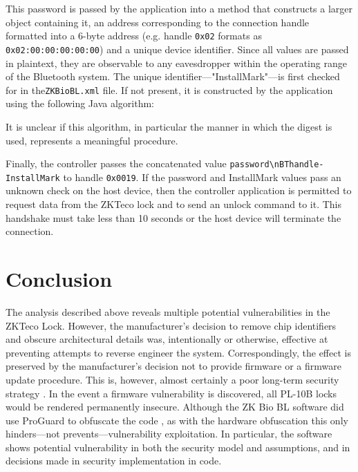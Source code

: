 \documentclass[conference]{IEEEtran}
\begin{document}
\bigskip

This password is passed by the application into a method that constructs a larger object containing it, an address corresponding to the connection handle formatted into a 6-byte address (e.g. handle \verb|0x02| formats as \verb|0x02:00:00:00:00:00|) and a unique device identifier.  Since all values are passed in plaintext, they are observable to any eavesdropper within the operating range of the Bluetooth system.  The unique identifier---"InstallMark"---is first checked for in the\verb|ZKBioBL.xml| file.  If not present, it is constructed by the application using the following Java algorithm:



It is unclear if this algorithm, in particular the manner in which the digest is used, represents a meaningful procedure.

\bigskip

Finally, the controller passes the concatenated value \verb|password\nBThandle-InstallMark| to handle \verb|0x0019|.  If the password and InstallMark values pass an unknown check on the host device, then the controller application is permitted to request data from the ZKTeco lock and to send an unlock command to it.  This handshake must take less than 10 seconds or the host device will terminate the connection.

\section{Conclusion}

The analysis described above reveals multiple potential vulnerabilities in the ZKTeco Lock. However, the manufacturer's decision to remove chip identifiers and obscure architectural details was, intentionally or otherwise, effective at preventing attempts to reverse engineer the system.  Correspondingly, the effect is preserved by the manufacturer's decision not to provide firmware or a firmware update procedure.  This is, however, almost certainly a poor long-term security strategy \cite{Rescorla2003}.  In the event a firmware vulnerability is discovered, all PL-10B locks would be rendered permanently insecure.  Although the ZK Bio BL software did use ProGuard to obfuscate the code \cite{AndroidDevelopers}, as with the hardware obfuscation this only hinders---not prevents---vulnerability exploitation.  In particular, the software shows potential vulnerability in both the security model and assumptions, and in decisions made in security implementation in code.
\end{document}

